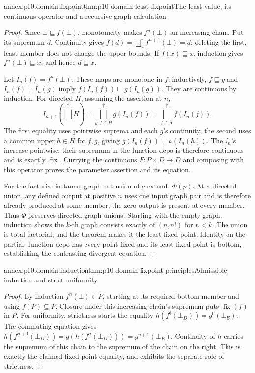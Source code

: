 \begin{annexitem}{annex:p10.domain.fixpoint}{thm:p10-domain-least-fixpoint}{The least value, its continuous operator and a recursive graph calculation}
\begin{proof}
Since \(\bot\sqsubseteq f(\bot)\), monotonicity makes
\(f^n(\bot)\) an increasing chain. Put its supremum \(d\).
Continuity gives \(f(d)=\bigsqcup_n^{\uparrow}f^{n+1}(\bot)=d\):
deleting the first, least member does not change the upper bounds.
If \(f(x)\sqsubseteq x\), induction gives
\(f^n(\bot)\sqsubseteq x\), and hence \(d\sqsubseteq x\).

Let \(I_n(f)=f^n(\bot)\). These maps are monotone in \(f\):
inductively, \(f\sqsubseteq g\) and \(I_n(f)\sqsubseteq I_n(g)\)
imply \(f(I_n(f))\sqsubseteq g(I_n(g))\).
They are continuous by induction. For directed \(H\), assuming
the assertion at \(n\),
\[
 I_{n+1}(\bigsqcup^{\uparrow}H)
   =\bigsqcup_{g,f\in H}^{\uparrow}g(I_n(f))
   =\bigsqcup_{f\in H}^{\uparrow}f(I_n(f)).
\]
The first equality uses pointwise suprema and each \(g\)'s
continuity; the second uses a common upper \(h\in H\) for
\(f,g\), giving \(g(I_n(f))\sqsubseteq h(I_n(h))\).
The \(I_n\)'s increase pointwise; their supremum in the function
dcpo is therefore continuous and is exactly \(\operatorname{fix}\).
Currying the continuous \(F:P\times D\to D\) and composing
with this operator proves the parameter assertion and its equation.

For the factorial instance, graph extension of \(p\) extends
\(\Phi(p)\). At a directed union, any defined output at positive
\(n\) uses one input graph pair and is therefore already produced
at some member; the zero output is present at every member.
Thus \(\Phi\) preserves directed graph unions. Starting with the
empty graph, induction shows the \(k\)-th graph consists exactly
of \((n,n!)\) for \(n<k\). The union is total factorial, and
the theorem makes it the least fixed point. Identity on the partial-
function dcpo has every point fixed and its least fixed point is
bottom, establishing the contrasting divergent equation.
\end{proof}
\end{annexitem}

\begin{annexitem}{annex:p10.domain.induction}{thm:p10-domain-fixpoint-principles}{Admissible induction and strict uniformity}
\begin{proof}
By induction \(f^n(\bot)\in P\), starting at its required bottom
member and using \(f(P)\subseteq P\). Closure under this increasing
chain's supremum puts \(\operatorname{fix}(f)\) in \(P\).
For uniformity, strictness starts the equality
\(h(f^0(\bot_D))=g^0(\bot_E)\). The commuting equation gives
\(h(f^{n+1}(\bot_D))=g(h(f^n(\bot_D)))=g^{n+1}(\bot_E)\).
Continuity of \(h\) carries the supremum of this chain to the
supremum of the chain on the right. This is exactly the claimed
fixed-point equality, and exhibits the separate role of strictness.
\end{proof}
\end{annexitem}

